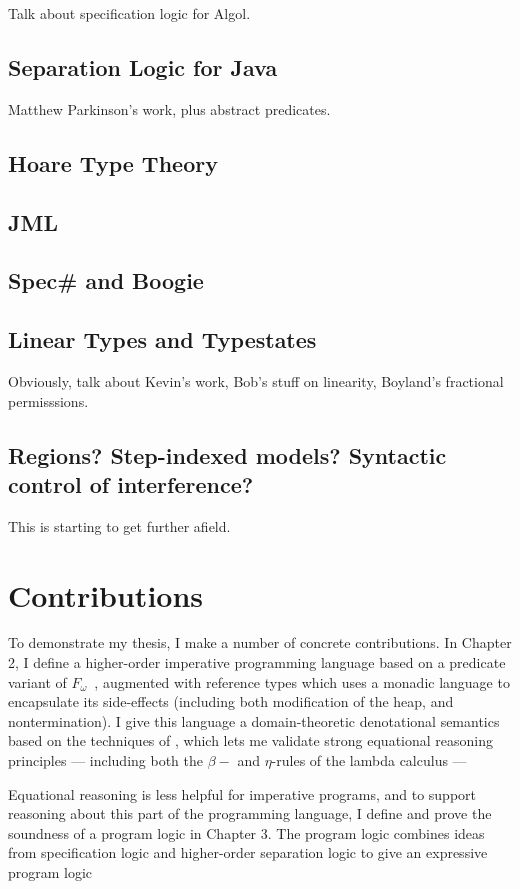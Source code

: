 Talk about specification logic for Algol.
\subsection{Separation Logic for Java}

Matthew Parkinson's work, plus abstract predicates.

\subsection{Hoare Type Theory}

\subsection{JML}

\subsection{Spec\# and Boogie}

\subsection{Linear Types and Typestates}

Obviously, talk about Kevin's work, Bob's stuff on linearity, Boyland's
fractional permisssions.

\subsection{Regions? Step-indexed models? Syntactic control of interference?}

This is starting to get further afield.



\section{Contributions}

To demonstrate my thesis, I make a number of concrete contributions.
In Chapter 2, I define a higher-order imperative programming language
based on a predicate variant of $F_\omega$~\citep{fomega}, augmented
with reference types which uses a monadic language to encapsulate its
side-effects (including both modification of the heap, and
nontermination). I give this language a domain-theoretic denotational
semantics based on the techniques of \citet{smyth-plotkin}, which lets
me validate strong equational reasoning principles --- including both
the $\beta-$ and $\eta$-rules of the lambda calculus ---

Equational reasoning is less helpful for imperative programs, and to
support reasoning about this part of the programming language, I
define and prove the soundness of a program logic in Chapter 3. The
program logic combines ideas from specification logic and higher-order
separation logic to give an expressive program logic 
